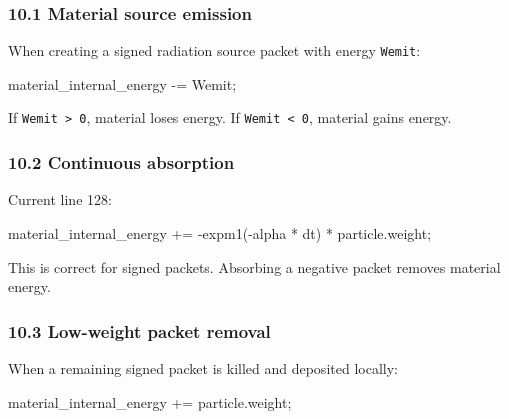 \documentclass[
]{article}
\newenvironment{Shaded}{}{}
\newcommand{\NormalTok}[1]{#1}
\newcommand{\OperatorTok}[1]{\textcolor[rgb]{0.40,0.40,0.40}{#1}}
\begin{document}
\subsubsection{10.1 Material source
emission}\label{material-source-emission}

When creating a signed radiation source packet with energy
\texttt{Wemit}:

\begin{Shaded}
\begin{Highlighting}[]
\NormalTok{material\_internal\_energy }\OperatorTok{{-}=}\NormalTok{ Wemit}\OperatorTok{;}
\end{Highlighting}
\end{Shaded}

If \texttt{Wemit\ \textgreater{}\ 0}, material loses energy. If
\texttt{Wemit\ \textless{}\ 0}, material gains energy.

\subsubsection{10.2 Continuous absorption}\label{continuous-absorption}

Current line 128:

\begin{Shaded}
\begin{Highlighting}[]
\NormalTok{material\_internal\_energy }\OperatorTok{+=} \OperatorTok{{-}}\NormalTok{expm1}\OperatorTok{({-}}\NormalTok{alpha }\OperatorTok{*}\NormalTok{ dt}\OperatorTok{)} \OperatorTok{*}\NormalTok{ particle}\OperatorTok{.}\NormalTok{weight}\OperatorTok{;}
\end{Highlighting}
\end{Shaded}

This is correct for signed packets. Absorbing a negative packet removes
material energy.

\subsubsection{10.3 Low-weight packet
removal}\label{low-weight-packet-removal}

When a remaining signed packet is killed and deposited locally:

\begin{Shaded}
\begin{Highlighting}[]
\NormalTok{material\_internal\_energy }\OperatorTok{+=}\NormalTok{ particle}\OperatorTok{.}\NormalTok{weight}\OperatorTok{;}
\end{Highlighting}
\end{Shaded}
\end{document}
